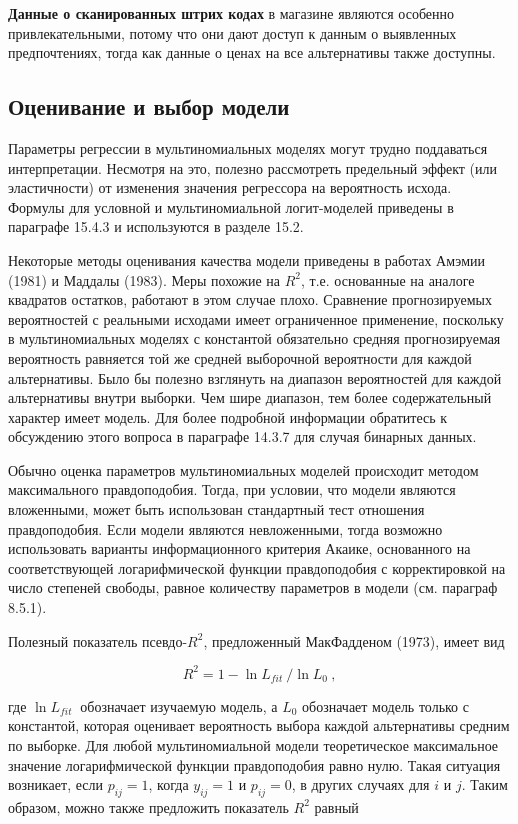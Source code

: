 \textbf{Данные о сканированных штрих кодах} в магазине являются особенно привлекательными, потому что они дают доступ к данным о выявленных предпочтениях, тогда как данные о ценах на все альтернативы также доступны.

\subsection{Оценивание и выбор модели}

Параметры регрессии в мультиномиальных моделях могут трудно поддаваться интерпретации. Несмотря на это, полезно рассмотреть предельный эффект (или эластичности) от изменения значения регрессора на вероятность исхода. Формулы для условной и мультиномиальной логит-моделей приведены в параграфе 15.4.3 и используются в разделе 15.2.

Некоторые методы оценивания качества модели приведены в работах Амэмии (1981) и Маддалы (1983). Меры похожие на $R^2$, т.е. основанные на аналоге квадратов остатков, работают в этом случае плохо. Сравнение прогнозируемых вероятностей с реальными исходами имеет ограниченное применение, поскольку в мультиномиальных моделях с константой обязательно средняя прогнозируемая вероятность равняется той же средней выборочной вероятности для каждой альтернативы. Было бы полезно взглянуть на диапазон вероятностей для каждой альтернативы внутри выборки. Чем шире диапазон, тем более содержательный характер имеет модель. Для более подробной информации обратитесь к обсуждению этого вопроса в параграфе 14.3.7 для случая бинарных данных.

Обычно оценка параметров мультиномиальных моделей происходит методом максимального правдоподобия. Тогда, при условии, что модели являются вложенными, может быть использован стандартный тест отношения правдоподобия. Если модели являются невложенными, тогда возможно использовать варианты информационного критерия Акаике, основанного на соответствующей логарифмической функции правдоподобия с корректировкой на число степеней свободы, равное количеству параметров в модели (см. параграф 8.5.1).

Полезный показатель псевдо-$R^2$, предложенный МакФадденом (1973), имеет вид

\begin{equation} \label{GrindEQ__15_9_} 
R^2=1-{{\ln  L_{fit}\ }}/{{\ln  L_0\ },} 
\end{equation} 

где ${\ln  L_{fit}\ }$ обозначает изучаемую модель, а $L_0$ обозначает модель только с константой, которая оценивает вероятность выбора каждой альтернативы  средним по выборке. Для любой мультиномиальной модели теоретическое максимальное значение логарифмической функции правдоподобия равно нулю. Такая ситуация возникает, если $p_{ij}=1$, когда $y_{ij}=1$ и $p_{ij}=0$, в других случаях для $i$ и $j$. Таким образом, можно также предложить показатель $R^2$ равный

